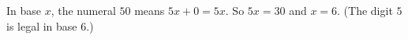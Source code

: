 In base $x$, the numeral $50$ means $5x+0=5x$. So $5x=30$ and $x=\boxed{6}$. (The digit $5$ is legal in base $6$.)

